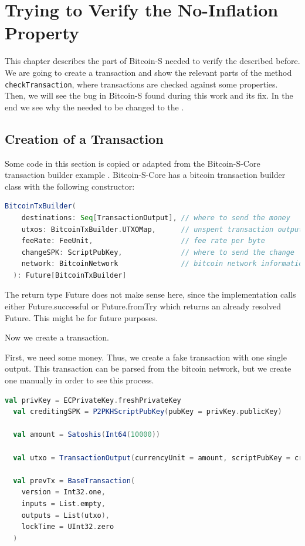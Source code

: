 \chapter{Trying to Verify the No-Inflation Property}
\label{chap:verify_check}

This chapter describes the part of Bitcoin-S needed to verify the  described before.
We are going to create a transaction and show the relevant parts of the method \texttt{checkTransaction}, where transactions are checked against some properties.
Then, we will see the bug in Bitcoin-S found during this work and its fix.
In the end we see why the  needed to be changed to the .


\section{Creation of a Transaction}

Some code in this section is copied or adapted from the Bitcoin-S-Core transaction builder example \cite{BitcoinSCore:txbuilderexample}.
Bitcoin-S-Core has a bitcoin transaction builder class with the following constructor:
\begin{lstlisting}[language=scala]
  BitcoinTxBuilder(
    destinations: Seq[TransactionOutput], // where to send the money
    utxos: BitcoinTxBuilder.UTXOMap,      // unspent transaction outputs
    feeRate: FeeUnit,                     // fee rate per byte
    changeSPK: ScriptPubKey,              // where to send the change
    network: BitcoinNetwork               // bitcoin network information
  ): Future[BitcoinTxBuilder]
\end{lstlisting}

The return type Future does not make sense here, since the implementation calls either Future.successful or Future.fromTry which returns an already resolved Future.
This might be for future purposes.

Now we create a transaction.

First, we need some money.
Thus, we create a fake transaction with one single output.
This transaction can be parsed from the bitcoin network, but we create one manually in order to see this process.
\begin{lstlisting}[language=scala]
  val privKey = ECPrivateKey.freshPrivateKey
  val creditingSPK = P2PKHScriptPubKey(pubKey = privKey.publicKey)

  val amount = Satoshis(Int64(10000))

  val utxo = TransactionOutput(currencyUnit = amount, scriptPubKey = creditingSPK)

  val prevTx = BaseTransaction(
    version = Int32.one,
    inputs = List.empty,
    outputs = List(utxo),
    lockTime = UInt32.zero
  )
\end{lstlisting}

